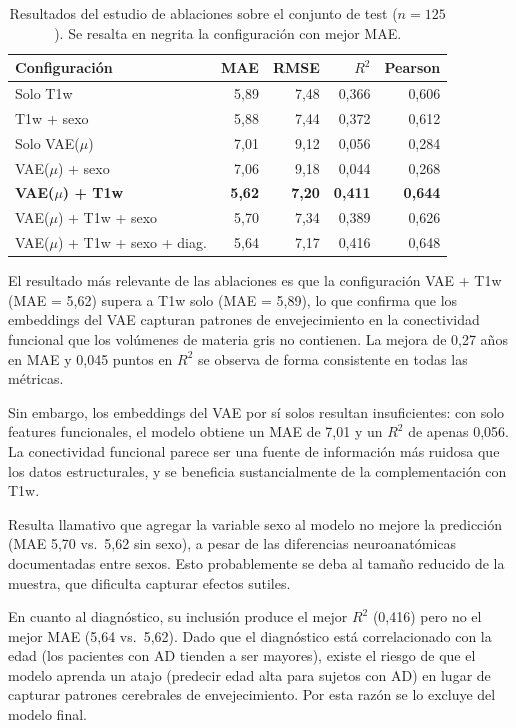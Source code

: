 \begin{table}[H]
\centering
\caption{Resultados del estudio de ablaciones sobre el conjunto de test ($n = 125$). Se resalta en negrita la configuración con mejor MAE.}
\label{tab:ablaciones}
\begin{tabular}{lrrrr}
\toprule
\textbf{Configuración} & \textbf{MAE} & \textbf{RMSE} & \textbf{$R^2$} & \textbf{Pearson} \\
\midrule
Solo T1w & 5,89 & 7,48 & 0,366 & 0,606 \\
T1w + sexo & 5,88 & 7,44 & 0,372 & 0,612 \\
Solo VAE($\mu$) & 7,01 & 9,12 & 0,056 & 0,284 \\
VAE($\mu$) + sexo & 7,06 & 9,18 & 0,044 & 0,268 \\
\textbf{VAE($\mu$) + T1w} & \textbf{5,62} & \textbf{7,20} & \textbf{0,411} & \textbf{0,644} \\
VAE($\mu$) + T1w + sexo & 5,70 & 7,34 & 0,389 & 0,626 \\
VAE($\mu$) + T1w + sexo + diag. & 5,64 & 7,17 & 0,416 & 0,648 \\
\bottomrule
\end{tabular}
\end{table}

El resultado más relevante de las ablaciones es que la configuración VAE + T1w (MAE = 5,62) supera a T1w solo (MAE = 5,89), lo que confirma que los embeddings del VAE capturan patrones de envejecimiento en la conectividad funcional que los volúmenes de materia gris no contienen. La mejora de 0,27 años en MAE y 0,045 puntos en $R^2$ se observa de forma consistente en todas las métricas.

Sin embargo, los embeddings del VAE por sí solos resultan insuficientes: con solo features funcionales, el modelo obtiene un MAE de 7,01 y un $R^2$ de apenas 0,056. La conectividad funcional parece ser una fuente de información más ruidosa que los datos estructurales, y se beneficia sustancialmente de la complementación con T1w.

Resulta llamativo que agregar la variable sexo al modelo no mejore la predicción (MAE 5,70 vs.\ 5,62 sin sexo), a pesar de las diferencias neuroanatómicas documentadas entre sexos. Esto probablemente se deba al tamaño reducido de la muestra, que dificulta capturar efectos sutiles.

En cuanto al diagnóstico, su inclusión produce el mejor $R^2$ (0,416) pero no el mejor MAE (5,64 vs.\ 5,62). Dado que el diagnóstico está correlacionado con la edad (los pacientes con AD tienden a ser mayores), existe el riesgo de que el modelo aprenda un atajo (predecir edad alta para sujetos con AD) en lugar de capturar patrones cerebrales de envejecimiento. Por esta razón se lo excluye del modelo final.


